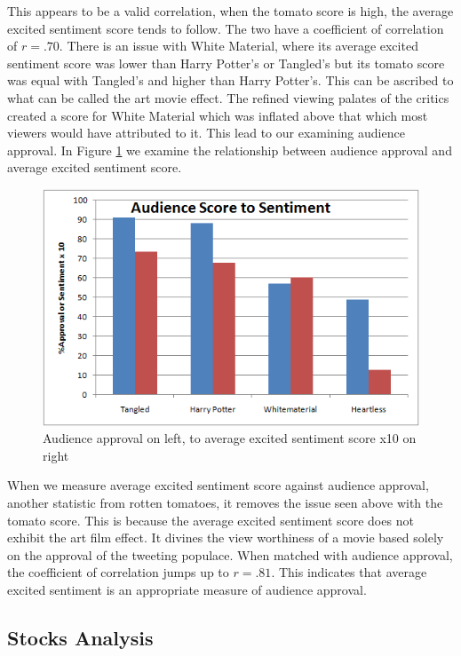 \documentclass[11pt]{article}
\begin{document}
This appears to be a valid correlation, when the tomato score is high, the average excited sentiment score tends to follow. The two have a coefficient of correlation of $r=.70$. There is an issue with White Material, where its average excited sentiment score was lower than Harry Potter's or Tangled's but its tomato score was equal with Tangled's and higher than Harry Potter's. This can be ascribed to what can be called the art movie effect. The refined viewing palates of the critics created a score for White Material which was inflated above that which most viewers would have attributed to it. This lead to our examining audience approval. In Figure \ref{fig:aapptos} we examine the relationship between audience approval and average excited sentiment score.
\begin{figure}[ht!]
\centering
\includegraphics[scale=.55]{img/aatos.png} 
\caption{Audience approval on left, to average excited sentiment score x10 on right}
\label{fig:aapptos}
\end{figure}

When we measure average excited sentiment score against audience approval, another statistic from rotten tomatoes, it removes the issue seen above with the tomato score. This is because the average excited sentiment score does not exhibit the art film effect. It divines the view worthiness of a movie based solely on the approval of the tweeting populace. When matched with audience approval, the coefficient of correlation jumps up to $r=.81$. This indicates that average excited sentiment is an appropriate measure of audience approval.





\subsection{Stocks Analysis}
\end{document}
